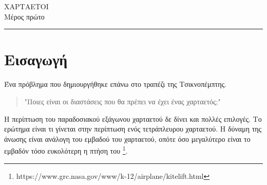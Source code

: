 \documentclass[11pt]{article}
\begin{document}
\begin{center}
\huge{ΧΑΡΤΑΕΤΟΙ}\\
{\LARGE Μέρος πρώτο}

\end{center}
\rule{\textwidth}{2pt}

\section*{Εισαγωγή}
Ένα πρόβλημα που δημιουργήθηκε επάνω στο τραπέζι της Τσικνοπέμπτης.
\begin{quotation}\begin{emph}
	"Ποιες είναι οι διαστάσεις που θα πρέπει να έχει ένας χαρταετός;"\end{emph}
\end{quotation}  Η περίπτωση του παραδοσιακού εξάγωνου χαρταετού δε δίνει και πολλές επιλογές. Το ερώτημα είναι τι γίνεται στην περίπτωση ενός τετράπλευρου χαρταετού. H δύναμη της άνωσης είναι ανάλογη του εμβαδού του χαρταετού, οπότε όσο μεγαλύτερο είναι το εμβαδόν τόσο ευκολότερη η πτήση του \footnote{https://www.grc.nasa.gov/www/k-12/airplane/kitelift.html}. 
\end{document}
